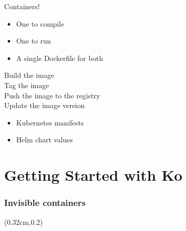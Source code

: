 \documentclass[aspectratio=169,11pt,hyperref={colorlinks=true}]{beamer}
\begin{document}
\begin{stripedframe}%
  {
    Containers!
    \begin{itemize}
      \item One to compile
      \item One to run
      \item A single Dockerfile for both
    \end{itemize}
  }%
  {
    \vspace{30pt}
    \setlststyledark
    
    \setlststyle
  }%
  {
    Build the image \\
    Tag the image \\
    Push the image to the registry \\
    Update the image version \\
    \begin{itemize}
      \item Kubernetes manifests
      \item Helm chart values
    \end{itemize}
  }%
  {
    \vspace{30pt}
    \setlststyledark
    
    \setlststyle
  }%
\end{stripedframe}

\section{Getting Started with Ko}

\begin{tblackbgrayframe}
  \frametitle{Invisible containers}
  \begin{textblock*}{\paperwidth}(0.32cm,0.2\paperheight)
    
  \end{textblock*}
  \setlststyle
\end{tblackbgrayframe}
\end{document}
